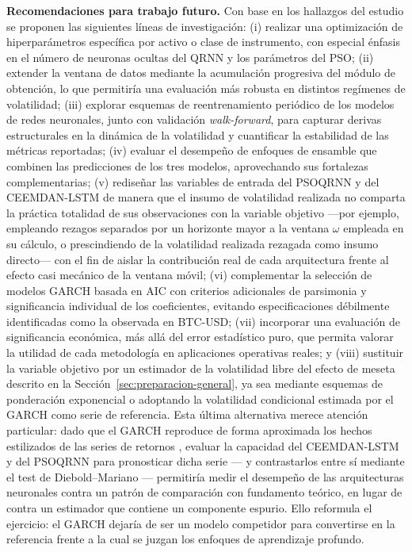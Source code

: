 \documentclass[12pt]{paper}
\begin{document}
\textbf{Recomendaciones para trabajo futuro.} Con base en los hallazgos del estudio se proponen las siguientes líneas de investigación: (i) realizar una optimización de hiperparámetros específica por activo o clase de instrumento, con especial énfasis en el número de neuronas ocultas del QRNN y los parámetros del PSO; (ii) extender la ventana de datos mediante la acumulación progresiva del módulo de obtención, lo que permitiría una evaluación más robusta en distintos regímenes de volatilidad; (iii) explorar esquemas de reentrenamiento periódico de los modelos de redes neuronales, junto con validación \textit{walk-forward}, para capturar derivas estructurales en la dinámica de la volatilidad y cuantificar la estabilidad de las métricas reportadas; (iv) evaluar el desempeño de enfoques de ensamble que combinen las predicciones de los tres modelos, aprovechando sus fortalezas complementarias; (v) rediseñar las variables de entrada del PSOQRNN y del CEEMDAN-LSTM de manera que el insumo de volatilidad realizada no comparta la práctica totalidad de sus observaciones con la variable objetivo —por ejemplo, empleando rezagos separados por un horizonte mayor a la ventana $\omega$ empleada en su cálculo, o prescindiendo de la volatilidad realizada rezagada como insumo directo— con el fin de aislar la contribución real de cada arquitectura frente al efecto casi mecánico de la ventana móvil; (vi) complementar la selección de modelos GARCH basada en AIC con criterios adicionales de parsimonia y significancia individual de los coeficientes, evitando especificaciones débilmente identificadas como la observada en BTC-USD; (vii) incorporar una evaluación de significancia económica, más allá del error estadístico puro, que permita valorar la utilidad de cada metodología en aplicaciones operativas reales; y (viii) sustituir la variable objetivo por un estimador de la volatilidad libre del efecto de meseta descrito en la Sección~\ref{sec:preparacion-general}, ya sea mediante esquemas de ponderación exponencial o adoptando la volatilidad condicional estimada por el GARCH como serie de referencia. Esta última alternativa merece atención particular: dado que el GARCH reproduce de forma aproximada los hechos estilizados de las series de retornos \citep{mcneil2015qrm}, evaluar la capacidad del CEEMDAN-LSTM y del PSOQRNN para pronosticar dicha serie --- y contrastarlos entre sí mediante el test de Diebold--Mariano --- permitiría medir el desempeño de las arquitecturas neuronales contra un patrón de comparación con fundamento teórico, en lugar de contra un estimador que contiene un componente espurio. Ello reformula el ejercicio: el GARCH dejaría de ser un modelo competidor para convertirse en la referencia frente a la cual se juzgan los enfoques de aprendizaje profundo.
\end{document}
